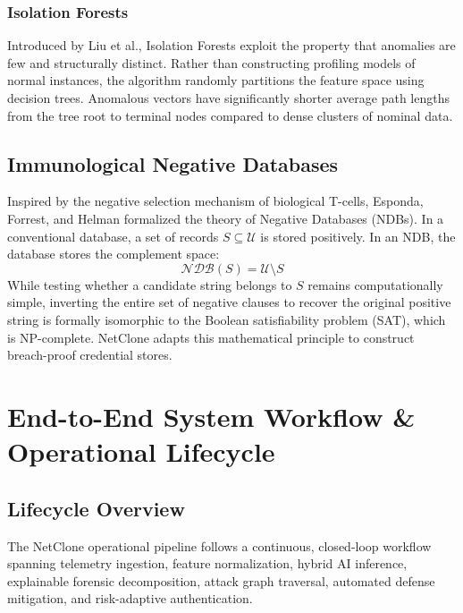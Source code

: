 \documentclass[12pt,a4paper]{report}
\begin{document}
\subsection{Isolation Forests}
Introduced by Liu et al., Isolation Forests exploit the property that anomalies are few and structurally distinct. Rather than constructing profiling models of normal instances, the algorithm randomly partitions the feature space using decision trees. Anomalous vectors have significantly shorter average path lengths from the tree root to terminal nodes compared to dense clusters of nominal data.

\section{Immunological Negative Databases}
Inspired by the negative selection mechanism of biological T-cells, Esponda, Forrest, and Helman formalized the theory of Negative Databases (NDBs). In a conventional database, a set of records $S \subseteq \mathcal{U}$ is stored positively. In an NDB, the database stores the complement space:
\begin{equation}
    \mathcal{NDB}(S) = \mathcal{U} \setminus S
\end{equation}
While testing whether a candidate string belongs to $S$ remains computationally simple, inverting the entire set of negative clauses to recover the original positive string is formally isomorphic to the Boolean satisfiability problem (SAT), which is NP-complete. NetClone adapts this mathematical principle to construct breach-proof credential stores.

\chapter{End-to-End System Workflow \& Operational Lifecycle}

\section{Lifecycle Overview}
The NetClone operational pipeline follows a continuous, closed-loop workflow spanning telemetry ingestion, feature normalization, hybrid AI inference, explainable forensic decomposition, attack graph traversal, automated defense mitigation, and risk-adaptive authentication.
\end{document}
